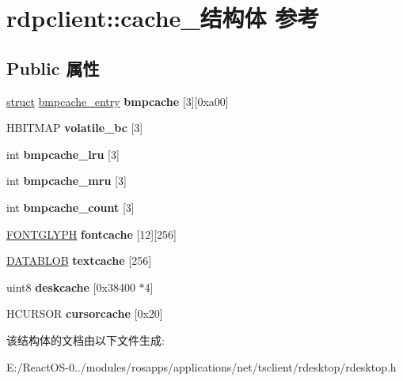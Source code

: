 \hypertarget{structrdpclient_1_1cache__}{}\section{rdpclient\+:\+:cache\+\_\+结构体 参考}
\label{structrdpclient_1_1cache__}
\subsection*{Public 属性}
\begin{DoxyCompactItemize}
\item 
\mbox{\label{structrdpclient_1_1cache___a97934e1d52cdcac5f149385a40c76932}} 
\hyperlink{interfacestruct}{struct} \hyperlink{structbmpcache__entry}{bmpcache\+\_\+entry} {\bfseries bmpcache} \mbox{[}3\mbox{]}\mbox{[}0xa00\mbox{]}
\item 
\mbox{\label{structrdpclient_1_1cache___a24a5636469e717b12c91a92ab10d288f}} 
H\+B\+I\+T\+M\+AP {\bfseries volatile\+\_\+bc} \mbox{[}3\mbox{]}
\item 
\mbox{\label{structrdpclient_1_1cache___a359da875c944cbe116865ae97393881c}} 
int {\bfseries bmpcache\+\_\+lru} \mbox{[}3\mbox{]}
\item 
\mbox{\label{structrdpclient_1_1cache___a71241311ce2cb0dffb38e725bee437a4}} 
int {\bfseries bmpcache\+\_\+mru} \mbox{[}3\mbox{]}
\item 
\mbox{\label{structrdpclient_1_1cache___aed74bc4b352d1a6d2775689f9bb3f7ec}} 
int {\bfseries bmpcache\+\_\+count} \mbox{[}3\mbox{]}
\item 
\mbox{\label{structrdpclient_1_1cache___a2eec34f1942f45c132474936e02ec2fb}} 
\hyperlink{struct___f_o_n_t_g_l_y_p_h}{F\+O\+N\+T\+G\+L\+Y\+PH} {\bfseries fontcache} \mbox{[}12\mbox{]}\mbox{[}256\mbox{]}
\item 
\mbox{\label{structrdpclient_1_1cache___a9ba735ddd98d19e5d795006a4f0bbcce}} 
\hyperlink{struct___d_a_t_a_b_l_o_b}{D\+A\+T\+A\+B\+L\+OB} {\bfseries textcache} \mbox{[}256\mbox{]}
\item 
\mbox{\label{structrdpclient_1_1cache___ab32f45faf1463f832d7612acd03fad91}} 
uint8 {\bfseries deskcache} \mbox{[}0x38400 $\ast$4\mbox{]}
\item 
\mbox{\label{structrdpclient_1_1cache___a0945751a1c18ef15dabaa703afd2fe39}} 
H\+C\+U\+R\+S\+OR {\bfseries cursorcache} \mbox{[}0x20\mbox{]}
\end{DoxyCompactItemize}


该结构体的文档由以下文件生成\+:\begin{DoxyCompactItemize}
\item 
E\+:/\+React\+O\+S-\/0../modules/rosapps/applications/net/tsclient/rdesktop/rdesktop.\+h\end{DoxyCompactItemize}

